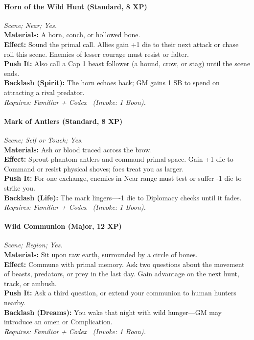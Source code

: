 \paragraph{Horn of the Wild Hunt (Standard, 8 XP)} \emph{Scene; Near; Yes.}\\
\textbf{Materials:} A horn, conch, or hollowed bone.\\
\textbf{Effect:} Sound the primal call. Allies gain +1 die to their next attack or chase roll this scene. Enemies of lesser courage must resist or falter.\\
\textbf{Push It:} Also call a Cap 1 beast follower (a hound, crow, or stag) until the scene ends.\\
\textbf{Backlash (Spirit):} The horn echoes back; GM gains 1 SB to spend on attracting a rival predator.\\
\emph{Requires: Familiar + Codex \ (\textit{Invoke:} 1 Boon).}

\paragraph{Mark of Antlers (Standard, 8 XP)} \emph{Scene; Self or Touch; Yes.}\\
\textbf{Materials:} Ash or blood traced across the brow.\\
\textbf{Effect:} Sprout phantom antlers and command primal space. Gain +1 die to Command or resist physical shoves; foes treat you as larger.\\
\textbf{Push It:} For one exchange, enemies in Near range must test or suffer -1 die to strike you.\\
\textbf{Backlash (Life):} The mark lingers—-1 die to Diplomacy checks until it fades.\\
\emph{Requires: Familiar + Codex \ (\textit{Invoke:} 1 Boon).}

\paragraph{Wild Communion (Major, 12 XP)} \emph{Scene; Region; Yes.}\\
\textbf{Materials:} Sit upon raw earth, surrounded by a circle of bones.\\
\textbf{Effect:} Commune with primal memory. Ask two questions about the movement of beasts, predators, or prey in the last day. Gain advantage on the next hunt, track, or ambush.\\
\textbf{Push It:} Ask a third question, or extend your communion to human hunters nearby.\\
\textbf{Backlash (Dreams):} You wake that night with wild hunger—GM may introduce an omen or Complication.\\
\emph{Requires: Familiar + Codex \ (\textit{Invoke:} 1 Boon).}

